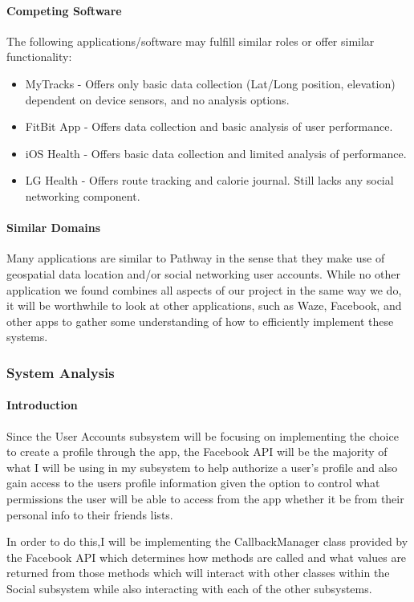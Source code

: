 ﻿\documentclass{article}
\begin{document}
\paragraph{Competing Software}
The following applications/software may fulfill similar roles or offer similar functionality:
\begin{itemize}
    \item MyTracks - Offers only basic data collection (Lat/Long position, elevation) dependent on device sensors, and no analysis options.
    \item FitBit App - Offers data collection and basic analysis of user performance.
    \item iOS Health - Offers basic data collection and limited analysis of performance.
    \item LG Health - Offers route tracking and calorie journal. Still lacks any social networking component.
\end{itemize}

\paragraph{Similar Domains}
Many applications are similar to Pathway in the sense that they make use of geospatial data location and/or social networking user accounts. While no other application we found combines all aspects of our project in the same way we do, it will be worthwhile to look at other applications, such as Waze, Facebook, and other apps to gather some understanding of how to efficiently implement these systems.

\subsubsection{System Analysis}
\paragraph{Introduction}
Since the User Accounts subsystem will be focusing on implementing the choice to create a profile through the app, the Facebook API will be the majority of what I will be using in my subsystem to help authorize a user’s profile and also gain access to the users profile information given the option to control what permissions the user will be able to access from the app whether it be from their personal info to their friends lists.
	
In order to do this,I will be implementing the CallbackManager class provided by the Facebook API which determines how methods are called and what values are returned from those methods which will interact with other classes within the Social subsystem while also interacting with each of the other subsystems.
\end{document}
